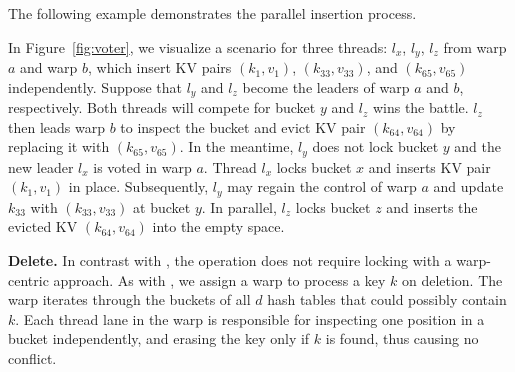 



The following example demonstrates the parallel insertion process.
\begin{example}
	In Figure~\ref{fig:voter}, we visualize a scenario for three threads: $l_x$, $l_y$, $l_z$ from warp $a$ and warp $b$, which insert KV pairs $(k_1,v_1)$, $(k_{33},v_{33})$, and $(k_{65},v_{65})$ independently. 
	Suppose that $l_y$ and $l_z$ become the leaders of warp $a$ and $b$, respectively. Both threads will compete for bucket $y$ and $l_z$ wins the battle. 
	$l_z$ then leads warp $b$ to inspect the bucket and evict KV pair $(k_{64},v_{64})$ by replacing it with $(k_{65},v_{65})$. 
	In the meantime, $l_y$ does not lock bucket $y$ and the new leader $l_x$ is voted in warp $a$. 
	Thread $l_x$ locks bucket $x$ and inserts KV pair $(k_1,v_1)$ in place. Subsequently, $l_y$ may regain the control of warp $a$ and update $k_{33}$ with $(k_{33},v_{33})$ at bucket $y$. In parallel, $l_z$ locks bucket $z$ and inserts the evicted KV $(k_{64},v_{64})$ into the empty space. 
\end{example}

\vspace{1mm}\noindent\textbf{Delete.} 
In contrast with , the  operation does not require locking with a warp-centric approach. 
As with , we assign a warp to process a key $k$ on deletion. The warp iterates through the buckets of all $d$ hash tables that could possibly contain $k$. Each thread lane in the warp is responsible for inspecting one position in a bucket independently, and erasing the key only if $k$ is found, thus causing no conflict.



